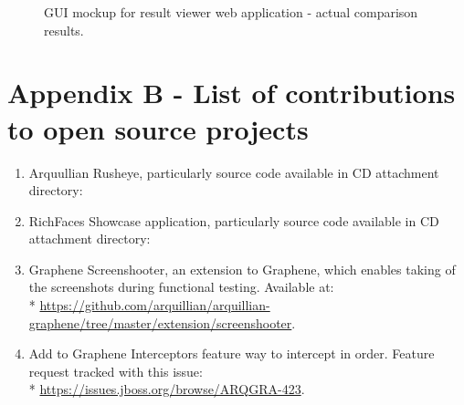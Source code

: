 \documentclass[11pt,oneside,final]{fithesis2}
\begin{document}
\begin{figure}[!htb]
    \begin{center}
    \leavevmode
    \centerline{}
    \end{center}
    \caption{GUI mockup for result viewer web application - actual comparison results.}
    \label{fig:comparisonResultMock}
\end{figure}

\chapter{Appendix B - List of contributions to open source projects}
\label{appendix:b}
\begin{enumerate}
 \item Arquullian Rusheye, particularly source code available in CD attachment directory:
 \item RichFaces Showcase application, particularly source code available in CD attachment directory:
 \item Graphene Screenshooter, an extension to Graphene, which enables taking of the screenshots during functional testing.
       Available at:\\* \url{https://github.com/arquillian/arquillian-graphene/tree/master/extension/screenshooter}.
 \item Add to Graphene Interceptors feature way to intercept in order. Feature request tracked with this issue:\\*
       \url{https://issues.jboss.org/browse/ARQGRA-423}.
\end{enumerate}
\end{document}
